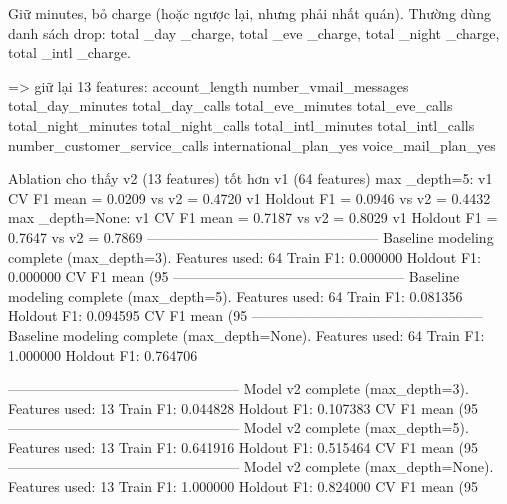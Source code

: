Giữ minutes, bỏ charge (hoặc ngược lại, nhưng phải nhất quán).
Thường dùng danh sách drop:
total \_day \_charge, total \_eve \_charge, total \_night \_charge, total \_intl \_charge.

=> giữ lại 13 features: account_length
number_vmail_messages
total_day_minutes
total_day_calls
total_eve_minutes
total_eve_calls
total_night_minutes
total_night_calls
total_intl_minutes
total_intl_calls
number_customer_service_calls
international_plan_yes
voice_mail_plan_yes

Ablation cho thấy v2 (13 features) tốt hơn v1 (64 features)
max \_depth=5:
v1 CV F1 mean = 0.0209 vs v2 = 0.4720
v1 Holdout F1 = 0.0946 vs v2 = 0.4432
max \_depth=None:
v1 CV F1 mean = 0.7187 vs v2 = 0.8029
v1 Holdout F1 = 0.7647 vs v2 = 0.7869
--------------------------------------------------
Baseline modeling complete (max_depth=3).
Features used: 64
Train F1: 0.000000
Holdout F1: 0.000000
CV F1 mean (95%
--------------------------------------------------
Baseline modeling complete (max_depth=5).
Features used: 64
Train F1: 0.081356
Holdout F1: 0.094595
CV F1 mean (95%
--------------------------------------------------
Baseline modeling complete (max_depth=None).
Features used: 64
Train F1: 1.000000
Holdout F1: 0.764706

--------------------------------------------------
Model v2 complete (max_depth=3).
Features used: 13
Train F1: 0.044828
Holdout F1: 0.107383
CV F1 mean (95%
--------------------------------------------------
Model v2 complete (max_depth=5).
Features used: 13
Train F1: 0.641916
Holdout F1: 0.515464
CV F1 mean (95%
--------------------------------------------------
Model v2 complete (max_depth=None).
Features used: 13
Train F1: 1.000000
Holdout F1: 0.824000
CV F1 mean (95%






